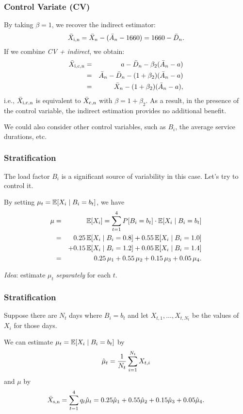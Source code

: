 \documentclass[t,usepdftitle=false,aspectratio=169]{beamer}
\begin{document}
\begin{frame}
	\frametitle{Control Variate (CV)}
	
	By taking \(\beta=1\), we recover the indirect estimator:
	\[
	\bar X_{\rm{i},n} = \bar X_n - (\bar A_n - 1660) = 1660 - \bar D_n.
	\]
	If we combine \emph{CV + indirect}, we obtain:
	\begin{eqnarray*}
		{\bar X_{\rm{i},\rm{c},n}} &=& a - \bar D_n - \beta_2 (\bar A_n - a) \\
		&=& \bar A_n - \bar D_n -(1+\beta_2)(\bar A_n - a) \\
		&=& \bar X_n -(1+\beta_2)(\bar A_n - a),
	\end{eqnarray*}
	i.e., \(\bar X_{\rm{i},\rm{c},n}\) is equivalent to \(\bar X_{\rm{c},n}\) 
	with \(\beta = 1+\beta_2\).
	As a result, in the presence of the control variable, the indirect estimation provides no additional benefit.
	
	\mbox{}
	
	We could also consider other control variables, such as \(B_i\), the average service durations, etc.
	
\end{frame}

\begin{frame}
	\frametitle{Stratification}
	
	The load factor \(B_i\) is a significant source of variability in this case. Let's try to control it.
	
	\mbox{}
	
	By setting \(\mu_t = {\mathbb{E}}[X_i\mid B_i=b_t]\), we have
	\begin{eqnarray*}
		\mu &=& {\mathbb{E}}[X_i]  = \sum_{t=1}^4 P[B_i = b_t] \cdot {\mathbb{E}}[X_i\mid B_i=b_t] \\
		&=&  0.25\, {\mathbb{E}}[X_i\mid B_i=0.8] + 0.55\, {\mathbb{E}}[X_i\mid B_i=1.0]  \\
		&& + 0.15\, {\mathbb{E}}[X_i\mid B_i=1.2] + 0.05\, {\mathbb{E}}[X_i\mid B_i=1.4]  \\
		&=&  0.25\,\mu_1 + 0.55\, \mu_2 + 0.15\, \mu_3 + 0.05\, \mu_4.
	\end{eqnarray*}
	
	\mbox{}
	
	\emph{Idea}: estimate \(\mu_t\) \emph{separately} 
	for each \(t\).
	
\end{frame}

\begin{frame}
	\frametitle{Stratification}
	
	Suppose there are \(N_t\) days where \(B_i = b_t\) and let
	\(X_{t,1},\dots, X_{t,N_t}\) be the values of \(X_i\) for those days. 
	
	\mbox{}
	
	We can estimate \(\mu_t = {\mathbb{E}}[X_i\mid B_i=b_t]\) by
	$$ {\hat\mu_t} = {1\over N_t} \sum_{i=1}^{N_t} X_{t,i} $$
	and \(\mu\) by
	\[
	{\bar X_{\rm{s},n}} = \sum_{t=1}^4 q_t \hat\mu_t 
	= 0.25 \hat\mu_1 + 0.55 \hat\mu_2 + 0.15 \hat\mu_3 + 0.05 \hat\mu_4.
	\]
	
\end{frame}
\end{document}
